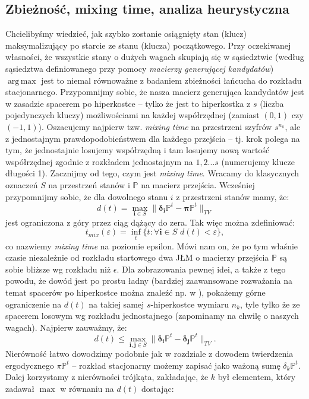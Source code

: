\documentclass[a4paper]{article}
\DeclareMathOperator*{\argmax}{arg\,max}
\theoremstyle{defn}
\theoremstyle{theorem}
\theoremstyle{lemma}
\theoremstyle{cor}
\theoremstyle{fact}
\begin{document}
\subsection{Zbieżność, mixing time, analiza heurystyczna}
Chcielibyśmy wiedzieć, jak szybko zostanie osiągnięty stan (klucz) maksymalizujący po starcie ze stanu (klucza) początkowego. Przy oczekiwanej własności, że wszystkie stany o dużych wagach skupiają się w sąsiedztwie (według sąsiedztwa definiowanego przy pomocy \textit{macierzy generującej kandydatów}) $\argmax$ jest to niemal równoważne z badaniem zbieżności łańcucha do rozkładu stacjonarnego. Przypomnijmy sobie, że nasza macierz generująca kandydatów jest w zasadzie spacerem po hiperkostce – tylko że jest to hiperkostka z $s$ (liczba pojedynczych kluczy) możliwościami na każdej współrzędnej (zamiast $(0,1)$ czy $(-1,1)$). Oszacujemy najpierw tzw. \textit{mixing time} na przestrzeni szyfrów $s^{n_k}$, ale z jednostajnym prawdopodobieństwem dla każdego przejścia – tj. krok polega na tym, że jednostajnie losujemy współrzędną i tam losujemy nową wartość współrzędnej zgodnie z rozkładem jednostajnym na $1,2...s$ (numerujemy klucze długości 1). Zacznijmy od tego, czym jest \textit{mixing time}. Wracamy do klasycznych oznaczeń $S$ na przestrzeń stanów i $\mathbb{P}$ na macierz przejścia. Wcześniej przypomnijmy sobie, że dla dowolnego stanu $i$ z przestrzeni stanów mamy, że:
$$d(t) = \max_{\boldsymbol{i} \in S} \|\boldsymbol{\delta_i} \mathbb{P}^t - \boldsymbol{\pi} \mathbb{P}^t\|_{TV}$$
jest ograniczona z góry przez ciąg dążący do zera. Tak więc można zdefiniować:
$$ t_{mix}(\varepsilon) = \inf_t \{t: \forall \boldsymbol{i} \in S\,\, d(t) < \varepsilon\},$$
co nazwiemy \textit{mixing time} na poziomie epsilon. Mówi nam on, że po tym właśnie czasie niezależnie od rozkładu startowego dwa JŁM o macierzy przejścia $\mathbb{P}$ są sobie bliższe wg rozkładu niż $\epsilon$. Dla zobrazowania pewnej idei, a także z tego powodu, że dowód jest po prostu ładny (bardziej zaawansowane rozważania na temat spacerów po hiperkostce można znaleźć np. w \cite{mixing}), pokażemy górne ograniczenie na $d(t)$ na takiej samej $s$-hiperkostce wymiaru $n_k$, tyle tylko że ze spacerem losowym wg rozkładu jednostajnego (zapominamy na chwilę o naszych wagach). Najpierw zauważmy, że:
$$d(t) \leq \max_{\boldsymbol{i},\boldsymbol{j} \in S} \|\boldsymbol{\delta_i} \mathbb{P}^t - \boldsymbol{\delta_j} \mathbb{P}^t \|_{TV}.$$
Nierówność łatwo dowodzimy podobnie jak w rozdziale z dowodem twierdzenia ergodycznego $\pi\mathbb{P}^t$ – rozkład stacjonarny możemy zapisać jako ważoną sumę $\delta_k \mathbb{P}^t$. Dalej korzystamy z nierówności trójkąta, zakładając, że $k$ był elementem, który zadawał $\max$ w równaniu na $d(t)$ dostając:
\end{document}
